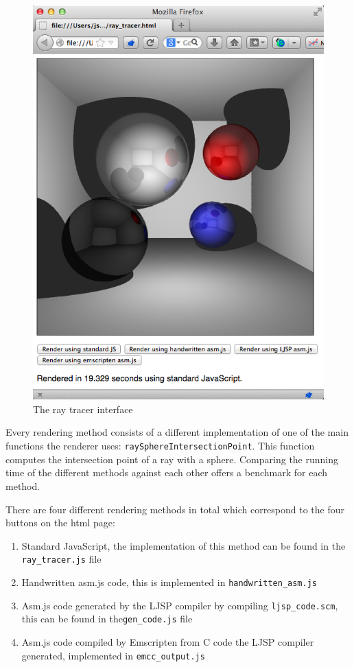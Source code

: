 \documentclass[11pt]{report}
\begin{document}
\begin{figure}[p]
\includegraphics[scale=0.7]{raytracinginterface.eps}
\caption{The ray tracer interface}
\label{raytracinginterface}
\end{figure}

Every rendering method consists of a different implementation of one of the main functions the renderer uses: \texttt{raySphereIntersectionPoint}. This function computes the intersection point of a ray with a sphere. Comparing the running time of the different methods against each other offers a benchmark for each method.

There are four different rendering methods in total which correspond to the four buttons on the html page:

\begin{enumerate}
\item Standard JavaScript, the implementation of this method can be found in the \texttt{ray_tracer.js} file
\item Handwritten asm.js code, this is implemented in \texttt{handwritten_asm.js}
\item Asm.js code generated by the LJSP compiler by compiling \texttt{ljsp_code.scm}, this can be found in the\texttt{gen_code.js} file
\item Asm.js code compiled by Emscripten from C code the LJSP compiler generated, implemented in \texttt{emcc_output.js}
\end{enumerate}
 
\end{document}
